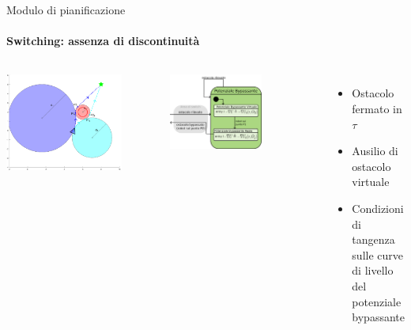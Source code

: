 \documentclass[handout]{beamer}
\begin{document}
\begin{frame}{Modulo di pianificazione}
\framesubtitle{Switching: assenza di discontinuità}
\begin{columns}
\centering
\hspace*{-5mm}
\includegraphics[width=1.1\textwidth]{circonferenze.png}
\centering
\begin{figure}
\includegraphics[width=0.8\textwidth]{statechartbypassante.png}
\end{figure}
\vspace{10mm}
\begin{itemize}
\item Ostacolo fermato in $\tau$
\item Ausilio di ostacolo virtuale
\item Condizioni di tangenza sulle curve di livello del potenziale bypassante
\end{itemize}
\end{columns}
\end{frame}
\end{document}
